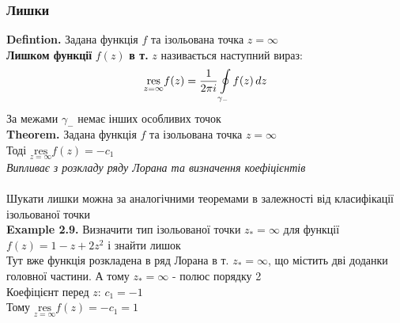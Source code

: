 \documentclass[a4paper, 14pt]{extarticle}
\def\residue#1#2{\underset{z = {#1}}{\textrm{res}} {#2}}
\def\hugespace{\vspace{5mm} \\}
\begin{document}
\subsubsection{Лишки}
\textbf{Defintion.} Задана функція $f$ та ізольована точка $z = \infty$\\
\textbf{Лишком функції} $f(z)$ \textbf{в т.} $z$ називається наступний вираз:
\begin{align*}
\residue{\infty}{f(z)} = \frac{1}{2 \pi i} \oint\displaylimits_{\gamma_-} f(z)\,dz
\end{align*}
За межами $\gamma_-$ немає інших особливих точок
\hugespace
\textbf{Theorem.} Задана функція $f$ та ізольована точка $z = \infty$\\ Тоді $\residue{\infty}{f(z)} = -c_1$\\
\textit{Випливає з розкладу ряду Лорана та визначення коефіцієнтів}\\
\hugespace
Шукати лишки можна за аналогічними теоремами в залежності від класифікації ізольованої точки
\hugespace
\textbf{Example 2.9.} Визначити тип ізольованої точки $z_* = \infty$ для функції $f(z) = 1 - z + 2z^2$ і знайти лишок\\
Тут вже функція розкладена в ряд Лорана в т. $z_* = \infty$, що містить дві доданки головної частини. А тому $z_* = \infty$ - полюс порядку 2\\
Коефіцієнт перед $z$: $c_1 = -1$\\
Тому $\residue{\infty}{f(z)} = -c_1 = 1$
\hugespace
\end{document}
